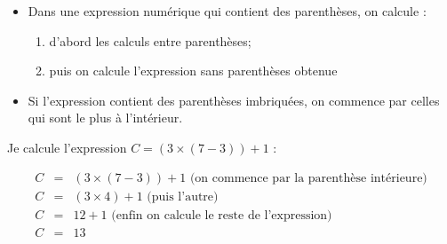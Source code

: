 \documentclass[12pt,a4paper]{article}
\begin{document}
\begin{myprop}
	\begin{itemize}
		\item Dans une expression numérique qui contient des parenthèses, on calcule :
		\begin{enumerate}
			\item d'abord les calculs entre parenthèses;
			\item puis on calcule l'expression sans parenthèses obtenue
		\end{enumerate}
	
		\item Si l'expression contient des parenthèses imbriquées, on commence par celles qui sont le plus à l'intérieur.
	\end{itemize}
	
	
\end{myprop}

\begin{myex}
	Je calcule l'expression $C = (3 \times (7 - 3))  + 1$ :
	
	\vspace*{-0.5cm}
	
	\begin{eqnarray*}
		C & = & (3 \times (7-3))  + 1 \text{ (on commence par la parenthèse intérieure)} \\
		C & = & (3 \times 4)+ 1 \text{ (puis l'autre)} \\
		C & = & 12  + 1 \text{ (enfin on calcule le reste de l'expression)}\\
		C & = & 13
	\end{eqnarray*}
\end{myex}

\end{document}
